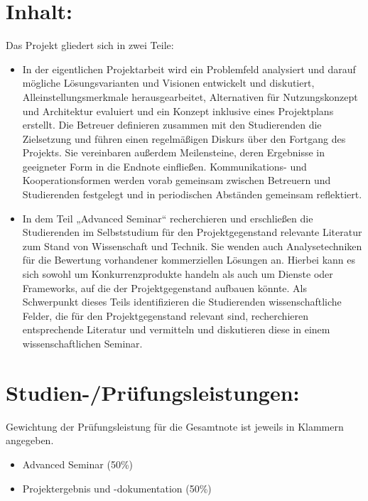 \section*{Inhalt:}\label{inhalt-10}

Das Projekt gliedert sich in zwei Teile:

\begin{itemize}
\tightlist
\item
  In der eigentlichen Projektarbeit wird ein Problemfeld analysiert und
  darauf mögliche Lösungsvarianten und Visionen entwickelt und
  diskutiert, Alleinstellungsmerkmale herausgearbeitet, Alternativen für
  Nutzungskonzept und Architektur evaluiert und ein Konzept inklusive
  eines Projektplans erstellt. Die Betreuer definieren zusammen mit den
  Studierenden die Zielsetzung und führen einen regelmäßigen Diskurs
  über den Fortgang des Projekts. Sie vereinbaren außerdem Meilensteine,
  deren Ergebnisse in geeigneter Form in die Endnote einfließen.
  Kommunikations- und Kooperationsformen werden vorab gemeinsam zwischen
  Betreuern und Studierenden festgelegt und in periodischen Abständen
  gemeinsam reflektiert.
\item
  In dem Teil „Advanced Seminar`` recherchieren und erschließen die
  Studierenden im Selbststudium für den Projektgegenstand relevante
  Literatur zum Stand von Wissenschaft und Technik. Sie wenden auch
  Analysetechniken für die Bewertung vorhandener kommerziellen Lösungen
  an. Hierbei kann es sich sowohl um Konkurrenzprodukte handeln als auch
  um Dienste oder Frameworks, auf die der Projektgegenstand aufbauen
  könnte. Als Schwerpunkt dieses Teils identifizieren die Studierenden
  wissenschaftliche Felder, die für den Projektgegenstand relevant sind,
  recherchieren entsprechende Literatur und vermitteln und diskutieren
  diese in einem wissenschaftlichen Seminar.
\end{itemize}

\section*{Studien-/Prüfungsleistungen:}\label{studien-pruxfcfungsleistungen-10}

Gewichtung der Prüfungsleistung für die Gesamtnote ist jeweils in
Klammern angegeben.

\begin{itemize}
\tightlist
\item
  Advanced Seminar (50\%)
\item
  Projektergebnis und -dokumentation (50\%)
\end{itemize}

